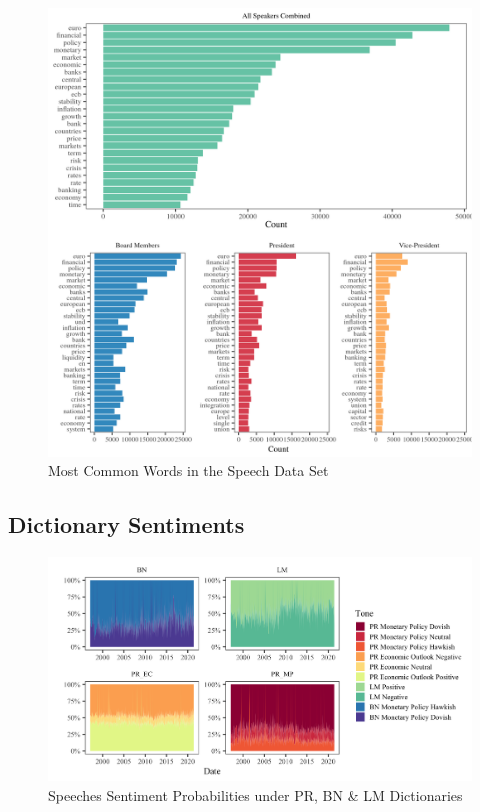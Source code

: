 \begin{figure}[H]
    \includegraphics[width = \textwidth]{figures/figcombo2.png}
    \vspace{-9mm}
    \caption{Most Common Words in the Speech Data Set}
    \label{fig:figcombo2}  
\end{figure}

\subsection{Dictionary Sentiments}
\begin{figure}[H]
    \includegraphics[width = \textwidth]{figures/sentiments.png}
    \vspace{-9mm}
    \caption{Speeches Sentiment Probabilities under PR, BN \& LM Dictionaries}
    \label{fig:sentprob}  
\end{figure}


